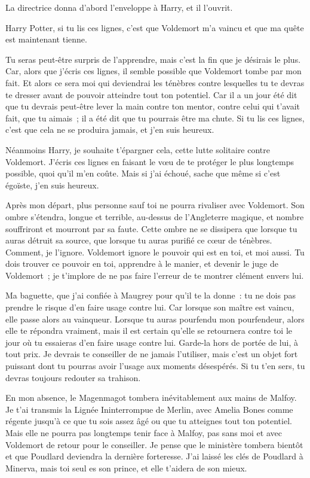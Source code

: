 La directrice donna d'abord l'enveloppe à Harry, et il l'ouvrit.

\later
\begin{writtenNote}
Harry Potter, si tu lis ces lignes, c'est que Voldemort m'a vaincu et que ma quête est maintenant tienne.

Tu seras peut-être surpris de l'apprendre, mais c'est la fin que je désirais le plus. Car, alors que j'écris ces lignes, il semble possible que Voldemort tombe par mon fait. Et alors ce sera moi qui deviendrai les ténèbres contre lesquelles tu te devras te dresser avant de pouvoir atteindre tout ton potentiel. Car il a un jour été dit que tu devrais peut-être lever la main contre ton mentor, contre celui qui t'avait fait, que tu aimais~; il a été dit que tu pourrais être ma chute. Si tu lis ces lignes, c'est que cela ne se produira jamais, et j'en suis heureux.

Néanmoins Harry, je souhaite t'épargner cela, cette lutte solitaire contre Voldemort. J'écris ces lignes en faisant le vœu de te protéger le plus longtemps possible, quoi qu'il m'en coûte. Mais si j'ai échoué, sache que même si c'est égoïste, j'en suis heureux.

Après mon départ, plus personne sauf toi ne pourra rivaliser avec Voldemort. Son ombre s'étendra, longue et terrible, au-dessus de l'Angleterre magique, et nombre souffriront et mourront par sa faute. Cette ombre ne se dissipera que lorsque tu auras détruit sa source, que lorsque tu auras purifié ce cœur de ténèbres. Comment, je l'ignore. Voldemort ignore le pouvoir qui est en toi, et moi aussi. Tu dois trouver ce pouvoir en toi, apprendre à le manier, et devenir le juge de Voldemort~; je t'implore de ne pas faire l'erreur de te montrer clément envers lui.

Ma baguette, que j'ai confiée à Maugrey pour qu'il te la donne~: tu ne dois pas prendre le risque d'en faire usage contre lui. Car lorsque son maître est vaincu, elle passe alors au vainqueur. Lorsque tu auras pourfendu mon pourfendeur, alors elle te répondra vraiment, mais il est certain qu'elle se retournera contre toi le jour où tu essaieras d'en faire usage contre lui. Garde-la hors de portée de lui, à tout prix. Je devrais te conseiller de ne jamais l'utiliser, mais c'est un objet fort puissant dont tu pourras avoir l'usage aux moments désespérés. Si tu t'en sers, tu devras toujours redouter sa trahison.

En mon absence, le Magenmagot tombera inévitablement aux mains de Malfoy. Je t'ai transmis la Lignée Ininterrompue de Merlin, avec Amelia Bones comme régente jusqu'à ce que tu sois assez âgé ou que tu atteignes tout ton potentiel. Mais elle ne pourra pas longtemps tenir face à Malfoy, pas sans moi et avec Voldemort de retour pour le conseiller. Je pense que le ministère tombera bientôt et que Poudlard deviendra la dernière forteresse. J'ai laissé les clés de Poudlard à Minerva, mais toi seul es son prince, et elle t'aidera de son mieux.


\end{writtenNote}
